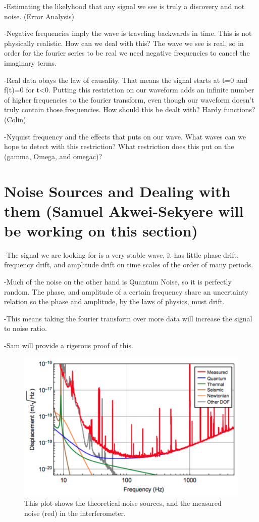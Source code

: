 \documentclass[twocolumn, groupedaddress]{revtex4-1}
\begin{document}
-Estimating the likelyhood that any signal we see is truly a discovery and not noise. (Error Analysis)

-Negative frequencies imply the wave is traveling backwards in time.  This is not physically realistic.  How can we deal with this?  The wave we see is real, so in order for the fourier series to be real we need negative frequencies to cancel the imaginary terms.

-Real data obays the law of causality.  That means the signal starts at t=0 and f(t)=0 for t<0.  Putting this restriction on our waveform adds an infinite number of higher frequencies to the fourier transform, even though our waveform doesn't truly contain those frequencies.  How should this be dealt with?  Hardy functions?  (Colin)

-Nyquist frequency and the effects that puts on our wave.  What waves can we hope to detect with this restriction?  What restriction does this put on the (gamma, Omega, and omegac)?

\section{Noise Sources and Dealing with them (Samuel Akwei-Sekyere will be working on this section)}
-The signal we are looking for is a very stable wave, it has little phase drift, frequency drift, and amplitude drift on time scales of the order of many periods.

-Much of the noise on the other hand is Quantum Noise, so it is perfectly random.  The phase, and amplitude of a certain frequency share an uncertainty relation so the phase and amplitude, by the laws of physics, must drift.

-This means taking the fourier transform over more data will increase the signal to noise ratio.

-Sam will provide a rigerous proof of this.

\begin{figure}[H]
	\centering
	\includegraphics[width=.75\linewidth]{aligoNoise.png}
	\caption{This plot shows the theoretical noise sources, and the measured noise (red) in the interferometer.}
\end{figure}
\end{document}
